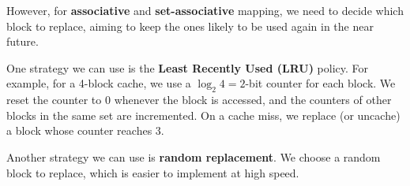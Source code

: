 However, for \textbf{associative} and \textbf{set-associative} mapping, we need to decide which block to replace, aiming to keep the ones likely to be used again in the near future.

One strategy we can use is the \textbf{Least Recently Used (LRU)} policy. For example, for a 4-block cache, we use a \(\log_2 4 = 2\)-bit counter for each block. We reset the counter to 0 whenever the block is accessed, and the counters of other blocks in the same set are incremented. On a cache miss, we replace (or uncache) a block whose counter reaches 3.

Another strategy we can use is \textbf{random replacement}. We choose a random block to replace, which is easier to implement at high speed.